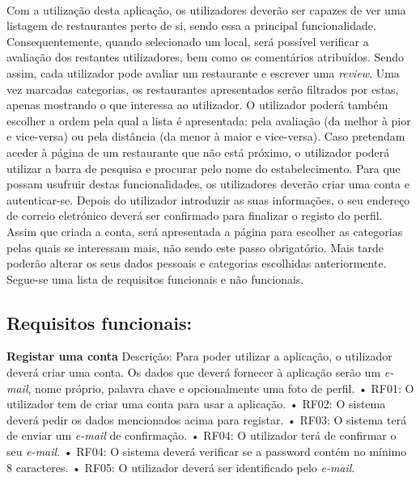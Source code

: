 \documentclass[a4paper,12pt]{scrreprt}
\begin{document}
    \paragraph{}
            Com a utilização desta aplicação, os utilizadores deverão ser capazes de ver uma listagem de restaurantes perto de si, sendo essa a principal funcionalidade. Consequentemente, quando selecionado um local, será possível verificar a avaliação dos restantes utilizadores, bem como os comentários atribuídos. Sendo assim, cada utilizador pode avaliar um restaurante e escrever uma \textit{review}.
            \newline Uma vez marcadas categorias, os restaurantes apresentados serão filtrados por estas, apenas mostrando o que interessa ao utilizador. O utilizador poderá também escolher a ordem pela qual a lista é apresentada: pela avaliação (da melhor à pior e vice-versa) ou pela distância (da menor à maior e vice-versa).
            Caso pretendam aceder à página de um restaurante que não está próximo, o utilizador poderá utilizar a barra de pesquisa e procurar pelo nome do estabelecimento.
            \newline  Para que possam usufruir destas funcionalidades, os utilizadores deverão criar uma conta e autenticar-se.
            Depois do utilizador introduzir as suas informações, o seu endereço de correio eletrónico deverá ser confirmado para finalizar o registo do perfil.
            Assim que criada a conta, será apresentada a página para escolher as categorias pelas quais se interessam mais, não sendo este passo obrigatório. Mais tarde poderão alterar os seus dados pessoais e categorias escolhidas anteriormente.
            \newline{} Segue-se uma lista de requisitos funcionais e não funcionais.\newline

            
            \subsection{Requisitos funcionais:}
           
            \textbf{Registar uma conta} \newline
            Descrição: Para poder utilizar a aplicação, o utilizador deverá criar uma conta. Os dados que deverá fornecer à aplicação serão um \textit{e-mail}, nome próprio, palavra chave e opcionalmente uma foto de perfil.\newline
             • RF01: O utilizador tem de criar uma conta para usar a aplicação. \newline
             • RF02: O sistema deverá pedir os dados mencionados acima para registar.\newline
             • RF03: O sistema terá de enviar um  \textit{e-mail} de confirmação. \newline
             • RF04: O utilizador terá de confirmar o seu  \textit{e-mail}.\newline
             • RF04: O sistema deverá verificar se a password contém no mínimo 8 caracteres.\newline
             • RF05: O utilizador deverá ser identificado pelo  \textit{e-mail}.\newline
            
\end{document}
